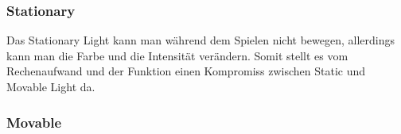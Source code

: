 \subsubsection{Stationary}
Das Stationary Light kann man während dem Spielen nicht bewegen, allerdings kann man die Farbe und die Intensität verändern. Somit stellt es vom Rechenaufwand und
der Funktion einen Kompromiss zwischen Static und Movable Light da. 

\subsubsection{Movable}

